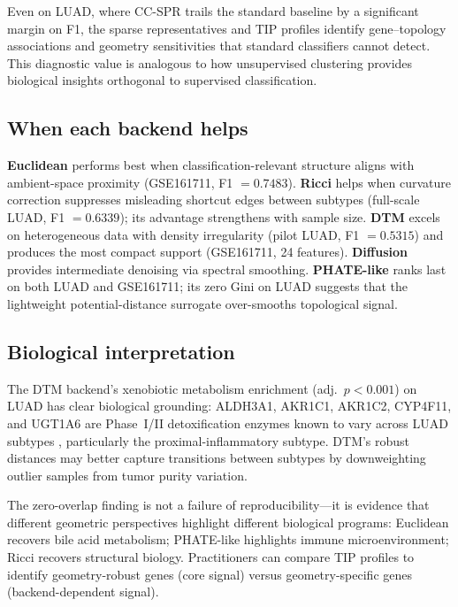 \documentclass[12pt]{article}
\begin{document}
Even on LUAD, where CC-SPR trails the standard baseline by a significant margin on F1, the sparse representatives and TIP profiles identify gene--topology associations and geometry sensitivities that standard classifiers cannot detect.
This diagnostic value is analogous to how unsupervised clustering provides biological insights orthogonal to supervised classification.

\subsection{When each backend helps}

\textbf{Euclidean} performs best when classification-relevant structure aligns with ambient-space proximity (GSE161711, F1 $= 0.7483$).
\textbf{Ricci} helps when curvature correction suppresses misleading shortcut edges between subtypes (full-scale LUAD, F1 $= 0.6339$); its advantage strengthens with sample size.
\textbf{DTM} excels on heterogeneous data with density irregularity (pilot LUAD, F1 $= 0.5315$) and produces the most compact support (GSE161711, 24 features).
\textbf{Diffusion} provides intermediate denoising via spectral smoothing.
\textbf{PHATE-like} ranks last on both LUAD and GSE161711; its zero Gini on LUAD suggests that the lightweight potential-distance surrogate over-smooths topological signal.

\subsection{Biological interpretation}

The DTM backend's xenobiotic metabolism enrichment (adj.\ $p < 0.001$) on LUAD has clear biological grounding: ALDH3A1, AKR1C1, AKR1C2, CYP4F11, and UGT1A6 are Phase~I/II detoxification enzymes known to vary across LUAD subtypes \cite{rizvi2017}, particularly the proximal-inflammatory subtype.
DTM's robust distances may better capture transitions between subtypes by downweighting outlier samples from tumor purity variation.

The zero-overlap finding is not a failure of reproducibility---it is evidence that different geometric perspectives highlight different biological programs: Euclidean recovers bile acid metabolism; PHATE-like highlights immune microenvironment; Ricci recovers structural biology.
Practitioners can compare TIP profiles to identify geometry-robust genes (core signal) versus geometry-specific genes (backend-dependent signal).
\end{document}
